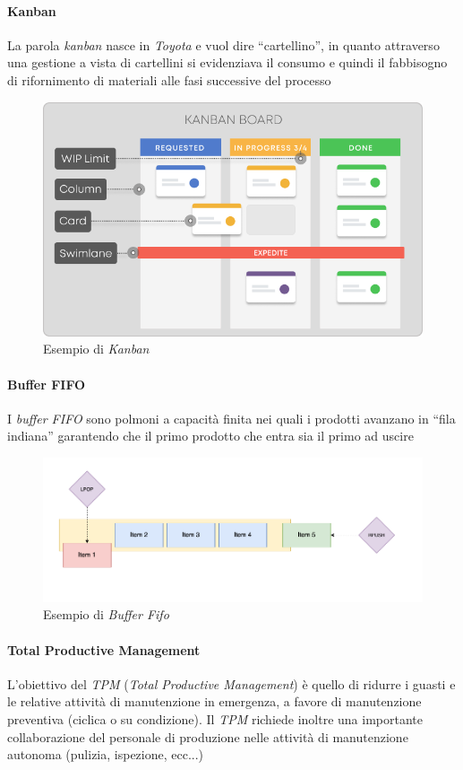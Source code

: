 \paragraph{Kanban}
La parola \textit{kanban} nasce in \textit{Toyota} e vuol dire “cartellino”, in quanto attraverso una gestione a vista di cartellini si evidenziava il consumo e quindi il fabbisogno di rifornimento di materiali alle fasi successive del processo

\begin{figure}[H]
	\includegraphics[width=0.8\linewidth]{resources/chapters/OrganizzazioneAziendale/images/kanban.png}
	\centering
	\caption{Esempio di \textit{Kanban}}
\end{figure}

\paragraph{Buffer FIFO}
I \textit{buffer FIFO} sono polmoni a capacità finita nei quali i prodotti avanzano in “fila indiana” garantendo che il primo prodotto che entra sia il primo ad uscire

\begin{figure}[H]
	\includegraphics[width=0.8\linewidth]{resources/chapters/OrganizzazioneAziendale/images/fifo.png}
	\centering
	\caption{Esempio di \textit{Buffer Fifo}}
\end{figure}

\paragraph{Total Productive Management}
L’obiettivo del \textit{TPM} (\textit{Total Productive Management}) è quello di ridurre i guasti e le relative attività di manutenzione in emergenza, a favore di manutenzione preventiva (ciclica o su condizione). Il \textit{TPM} richiede inoltre una importante collaborazione del personale di produzione nelle attività di manutenzione autonoma (pulizia, ispezione, ecc...)

